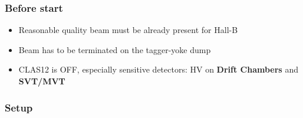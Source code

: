\subsubsection{Before start}

\begin{itemize}
\item Reasonable quality beam must be already present for Hall-B
\item Beam has to be terminated on the tagger-yoke dump
\item CLAS12 is OFF, especially sensitive detectors: HV on \textbf{Drift Chambers} and \textbf{SVT/MVT}
\end{itemize}

\subsubsection{Setup }

